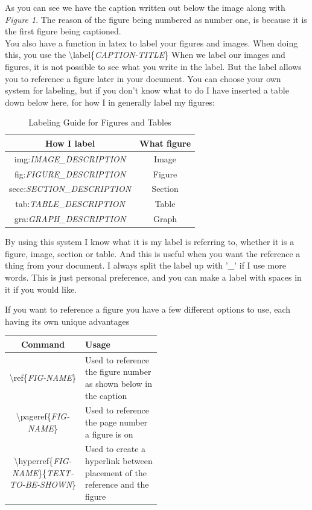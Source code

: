 \documentclass{article}
\newcommand{\jbs}[1]{\textbackslash{}#1} %
\begin{document}
As you can see we have the caption written out below the image along with \textit{Figure 1}.
The reason of the figure being numbered as number one, is because it is the first figure being captioned. \\

You also have a function in latex to label your figures and images. When doing this, you use the \jbs{label\{\textit{CAPTION-TITLE}\}}
When we label our images and figures, it is not possible to see what you write in the label.
But the label allows you to reference a figure later in your document. You can choose your own system for labeling, but if you don't know what to do I have inserted
a table down below here, for how I in generally label my figures: \\

\begin{table}[h]
    \centering
    \begin{tabular}{|c|c|}
        \hline
        \rowcolor{gray!30}
        How I label & What figure \\ 
        \hline
        img:\textit{IMAGE\_DESCRIPTION} & Image \\ 
        \hline
        fig:\textit{FIGURE\_DESCRIPTION} & Figure \\ 
        \hline
        secc:\textit{SECTION\_DESCRIPTION} & Section \\ 
        \hline
        tab:\textit{TABLE\_DESCRIPTION} & Table \\ 
        \hline
        gra:\textit{GRAPH\_DESCRIPTION} & Graph \\ 
        \hline
    \end{tabular}
    \caption{Labeling Guide for Figures and Tables}
    \label{tab:caption_labels}
\end{table}


By using this system I know what it is my label is referring to, whether it is a figure, image, section or table. And this is useful 
when you want the reference a thing from your document. I always split the label up with '\_' if I use more words. This is just personal preference, and you can make a
label with spaces in it if you would like.

If you want to reference a figure you have a few different options to use, each having its own unique advantages

\begin{table}[h]
    \centering
    \begin{tabular}{|c|p{0.50\linewidth}|}
        \hline
        \rowcolor{gray!30}
        Command & Usage \\
        \hline
        \jbs{ref\{\textit{FIG-NAME}\}} & Used to reference the figure number as shown below in the caption \\
        \hline
        \jbs{pageref\{\textit{FIG-NAME}\}} & Used to reference the page number a figure is on \\
        \hline
        \jbs{hyperref\{\textit{FIG-NAME}\}\{\textit{TEXT-TO-BE-SHOWN}\}} & Used to create a hyperlink between placement of the reference
         and the figure \\
        \hline
    \end{tabular}
\end{table}
\end{document}
